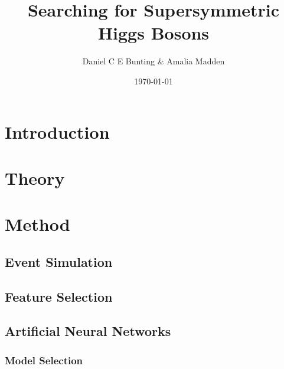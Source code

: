\documentclass{article}
\title{Searching for Supersymmetric Higgs Bosons}
\author{ Daniel C E Bunting \& Amalia Madden}
\date{\today}
\begin{document}
\maketitle
\begin{abstract}
\end{abstract}

\section{Introduction} %
\label{sec:introduction}


\section{Theory} %
\label{sec:theory}





\section{Method} %
\label{sec:method}

\subsection{Event Simulation} %
\label{sub:event_simulation}


\subsection{Feature Selection} %
\label{sub:feature_selection}

\subsection{Artificial Neural Networks} %
\label{sub:artificial_neural_networks}


\subsubsection{Model Selection} %
\label{ssub:model_selection}



\end{document}
